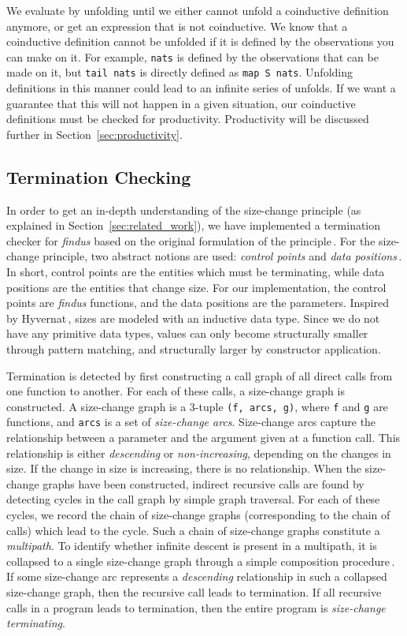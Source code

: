 We evaluate by unfolding until we either cannot unfold a coinductive definition anymore, or get an expression that is not coinductive. We know that a coinductive definition cannot be unfolded if it is defined by the observations you can make on it. For example, \texttt{nats} is defined by the observations that can be made on it, but \texttt{tail nats} is directly defined as \texttt{map S nats}. Unfolding definitions in this manner could lead to an infinite series of unfolds. If we want a guarantee that this will not happen in a given situation, our coinductive definitions must be checked for productivity. Productivity will be discussed further in Section~\ref{sec:productivity}. 

\subsection{Termination Checking}
In order to get an in-depth understanding of the size-change principle (as explained in Section~\ref{sec:related_work}), we have implemented a termination checker for \textit{findus} based on the original formulation of the principle\,\citep{LeeJones01SizeChange}. For the size-change principle, two abstract notions are used: \emph{control points} and \emph{data positions}\,\citep{Krauss07certifiedsizechange}. In short, control points are the entities which must be terminating, while data positions are the entities that change size. For our implementation, the control points are \textit{findus} functions, and the data positions are the parameters. Inspired by Hyvernat\,\citep{Hyvernat13}, sizes are modeled with an inductive data type. Since we do not have any primitive data types, values can only become structurally smaller through pattern matching, and structurally larger by constructor application.

Termination is detected by first constructing a call graph of all direct calls from one function to another. For each of these calls, a size-change graph is constructed. A size-change graph is a 3-tuple \texttt{(f, arcs, g)}, where \texttt{f} and \texttt{g} are functions, and \texttt{arcs} is a set of \emph{size-change arcs}. Size-change arcs capture the relationship between a parameter and the argument given at a function call. This relationship is either \emph{descending} or \emph{non-increasing}, depending on the changes in size. If the change in size is increasing, there is no relationship. When the size-change graphs have been constructed, indirect recursive calls are found by detecting cycles in the call graph by simple graph traversal. For each of these cycles, we record the chain of size-change graphs (corresponding to the chain of calls) which lead to the cycle. Such a chain of size-change graphs constitute a \emph{multipath}. To identify whether infinite descent is present in a multipath, it is collapsed to a single size-change graph through a simple composition procedure\,\citep{LeeJones01SizeChange}. If some size-change arc represents a \emph{descending} relationship in such a collapsed size-change graph, then the recursive call leads to termination. If all recursive calls in a program leads to termination, then the entire program is \emph{size-change terminating}.

